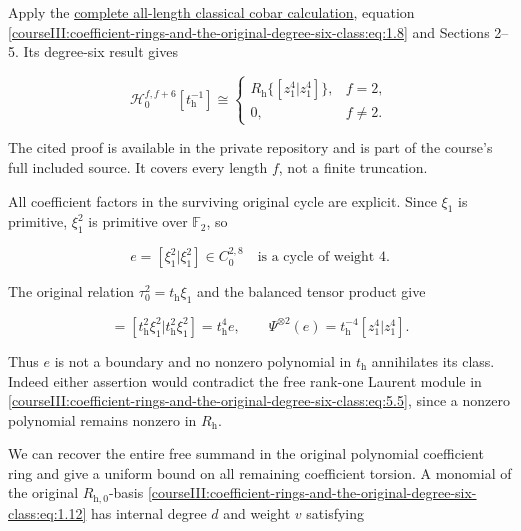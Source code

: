 Apply the \href{https://github.com/KokunoYumeto/open-math-courses/blob/46785fdb4bbf7c7ba22e5238561451e54d6cdf9a/docs/courses/CG-S6/src/the-degree-six-milnor-cobar-calculation.md}{complete all-length classical cobar calculation}, equation \eqref{courseIII:coefficient-rings-and-the-original-degree-six-class:eq:1.8} and Sections 2--5. Its degree-six result gives

\begin{equation}
\mathcal H_0^{f,f+6}[t_{\mathrm h}^{-1}]
   \cong
 \begin{cases}
 R_{\mathrm h}\{[z_1^4|z_1^4]\},&f=2,\\
 0,&f\ne2.
 \end{cases}
 \label{courseIII:coefficient-rings-and-the-original-degree-six-class:eq:5.5}
\end{equation}

The cited proof is available in the private repository and is part of the course's full included source. It covers every length \(f\), not a finite truncation.

All coefficient factors in the surviving original cycle are explicit. Since \(\xi_1\) is primitive, \(\xi_1^2\) is primitive over \(\mathbb F_2\), so

\begin{equation}
e=[\xi_1^2|\xi_1^2]\in C_0^{2,8}
 \quad\text{is a cycle of weight }4.
 \label{courseIII:coefficient-rings-and-the-original-degree-six-class:eq:5.6}
\end{equation}

The original relation \(\tau_0^2=t_{\mathrm h}\xi_1\) and the balanced tensor product give

\begin{equation}
[\tau_0^4|\tau_0^4]
   =[t_{\mathrm h}^2\xi_1^2|t_{\mathrm h}^2\xi_1^2]
   =t_{\mathrm h}^4 e,
 \qquad
 \Psi^{\otimes2}(e)
          =t_{\mathrm h}^{-4}[z_1^4|z_1^4].
 \label{courseIII:coefficient-rings-and-the-original-degree-six-class:eq:5.7}
\end{equation}

Thus \(e\) is not a boundary and no nonzero polynomial in \(t_{\mathrm h}\) annihilates its class. Indeed either assertion would contradict the free rank-one Laurent module in \eqref{courseIII:coefficient-rings-and-the-original-degree-six-class:eq:5.5}, since a nonzero polynomial remains nonzero in \(R_{\mathrm h}\).

We can recover the entire free summand in the original polynomial coefficient ring and give a uniform bound on all remaining coefficient torsion. A monomial of the original \(R_{\mathrm h,0}\)-basis \eqref{courseIII:coefficient-rings-and-the-original-degree-six-class:eq:1.12} has internal degree \(d\) and weight \(v\) satisfying

